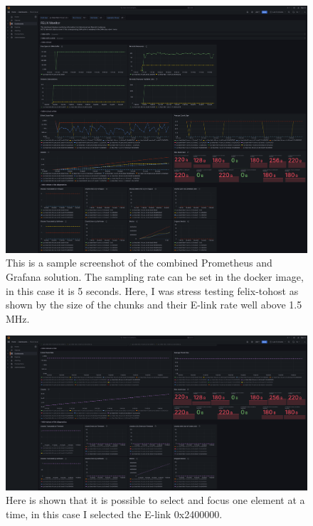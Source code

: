 \begin{figure}[H]
\centering
\includegraphics[width=\textwidth]{images/results/monitoring-merged.png}
\caption[Grafana sample screenshot]{This is a sample screenshot of the combined Prometheus and Grafana solution. The sampling rate can be set in the docker image, in this case it is 5 seconds. Here, I was stress testing felix-tohost as shown by the size of the chunks and their \acs{E-link} rate well above 1.5 MHz. }
\label{fig:felix-tohost-monitoring}
\end{figure}

\begin{figure}[H]
\centering
\includegraphics[width=\textwidth]{images/results/monitor-one-elink.png}
\caption[Grafana screenshot: select one E-link]{Here is shown that it is possible to select and focus one element at a time, in this case I selected the \acs{E-link} 0x2400000.}
\label{fig:felix-tohost-single-elink}
\end{figure}

